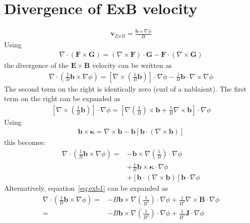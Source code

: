 \documentclass[12pt]{article}
\def\L{\left}
\def\R{\right}
\newcommand{\ve}[1]{\ensuremath{\boldsymbol{#1}}}
\begin{document}
\section{Divergence of ExB velocity}
%
\begin{align*}
\ve{v}_{ExB} = \frac{\ve{b}\times\nabla\phi}{B}
\end{align*}
%
Using
%
\begin{align*}
\nabla\cdot\L(\ve{F}\times\ve{G}\R) = \L(\nabla\times\ve{F}\R)\cdot\ve{G} -
\ve{F}\cdot\L(\nabla\times\ve{G}\R)
\end{align*}
%
the divergence of the $\ve{E}\times\ve{B}$ velocity can be written as
%
\begin{align}
\nabla\cdot\L(\frac{1}{B}\ve{b}\times\nabla\phi\R) =
\L[\nabla\times\L(\frac{1}{B}\ve{b}\R)\R]\cdot\nabla\phi -
\frac{1}{B}\ve{b}\cdot\nabla\times\nabla\phi
\label{eq:exb1}
\end{align}
%
The second term on the right is identically zero (curl of a nablaient). The
first term on the right can be expanded as
%
\begin{align*}
\L[\nabla\times\L(\frac{1}{B}\ve{b}\R)\R]\cdot\nabla\phi =
\L[\nabla\L(\frac{1}{B}\R)\times\ve{b} +
\frac{1}{B}\nabla\times\ve{b}\R]\cdot\nabla\phi
\end{align*}
%
Using
%
\begin{align*}
\ve{b}\times\ve{\kappa} = \nabla\times\ve{b} -
\ve{b}\L[\ve{b}\cdot\L(\nabla\times\ve{b}\R)\R]
\end{align*}
%
this becomes:
%
\begin{align*}
  \nabla\cdot\L(\frac{1}{B}\ve{b}\times\nabla\phi\R) =
  &-\ve{b}\times\nabla\L(\frac{1}{B}\R)\cdot\nabla\phi \\ &+
  \frac{1}{B}\ve{b}\times\ve{\kappa}\cdot\nabla\phi \\ &+
  \L[\ve{b}\cdot\L(\nabla\times\ve{b}\R)\R]\ve{b}\cdot\nabla\phi
\end{align*}
%
Alternatively, equation~\ref{eq:exb1} can be expanded as
%
\begin{align*}
  \nabla\cdot\L(\frac{1}{B}\ve{b}\times\nabla\phi\R) =&
    -B\ve{b}\times\nabla\L(\frac{1}{B^2}\R)\cdot\nabla\phi +
    \frac{1}{B^2}\nabla\times\ve{B}\cdot\nabla\phi \\ =&
    -B\ve{b}\times\nabla\L(\frac{1}{B^2}\R)\cdot\nabla\phi +
    \frac{1}{B^2}\ve{J}\cdot\nabla\phi
\end{align*}
%
\end{document}

